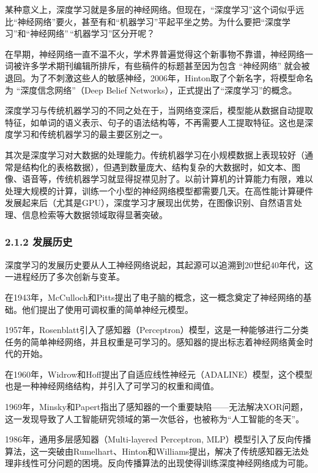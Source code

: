 某种意义上，深度学习就是多层的神经网络。但现在，``深度学习''这个词似乎远比``神经网络''要火，甚至有和``机器学习''平起平坐之势。为什么要把``深度学习''和``神经网络''\,``机器学习''区分开呢？

在早期，神经网络一直不温不火，学术界普遍觉得这个新事物不靠谱，神经网络一词被许多学术期刊编辑所排斥，有些稿件的标题甚至因为包含
``神经网络''
就会被退回。为了不刺激这些人的敏感神经，2006年，Hinton取了个新名字，将模型命名为
``深度信念网络''（Deep Belief Networks），正式提出了``深度学习''的概念。

深度学习与传统机器学习的不同之处在于，当网络变深后，模型能从数据自动提取特征，如单词的语义表示、句子的语法结构等，不再需要人工提取特征。这也是深度学习和传统机器学习的最主要区别之一。

其次是深度学习对大数据的处理能力。传统机器学习在小规模数据上表现较好（通常是结构化的表格数据），但遇到数量庞大、结构复杂的大数据时，如文本、图像、语音等，传统机器学习就显得捉襟见肘了。以前计算机的计算能力有限，难以处理大规模的计算，训练一个小型的神经网络模型都需要几天。在高性能计算硬件发展起来后（尤其是GPU），深度学习才展现出优势，在图像识别、自然语言处理、信息检索等大数据领域取得显著突破。

\subsubsection{\texorpdfstring{\textbf{2.1.2
发展历史}}{2.1.2 发展历史}}\label{212-ux53d1ux5c55ux5386ux53f2}

深度学习的发展历史要从人工神经网络说起，其起源可以追溯到20世纪40年代，这一进程经历了多次创新与变革。

在1943年，McCulloch和Pitts提出了电子脑的概念，这一概念奠定了神经网络的基础。他们提出了使用可调权重的简单神经元模型。

1957年，Rosenblatt引入了感知器（Perceptron）模型，这是一种能够进行二分类任务的简单神经网络，并且权重是可学习的。感知器的提出标志着神经网络黄金时代的开始。

在1960年，Widrow和Hoff提出了自适应线性神经元（ADALINE）模型，这个模型也是一种神经网络结构，并引入了可学习的权重和阈值。

1969年，Minsky和Papert指出了感知器的一个重要缺陷------无法解决XOR问题，这一发现导致了人工智能研究领域的第一次低谷，也被称为``人工智能的冬天''。

1986年，通用多层感知器（Multi-layered Perceptron,
MLP）模型引入了反向传播算法，这一突破由Rumelhart、Hinton和Williams提出，解决了传统感知器无法处理非线性可分问题的困境。反向传播算法的出现使得训练深度神经网络成为可能。

